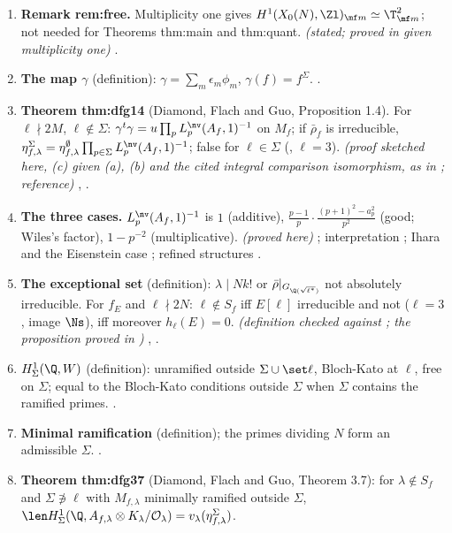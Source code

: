 \begin{enumerate}[label=\textbf{\thechapter.\arabic*}]
\item \textbf{Remark rem:free.} Multiplicity one gives $H^1(X_0(N),\Zl)_{\mf m}\simeq\T_{\mf m}^2$; not needed for Theorems thm:main and thm:quant. \emph{(stated; proved in  given multiplicity one)}
.
\item \textbf{The map $\gamma$} (definition): $\gamma=\sum_m\epsilon_m\phi_m$, $\gamma(f)=f^\Sigma$. .
\item \textbf{Theorem thm:dfg14} (Diamond, Flach and Guo, Proposition 1.4). For $\ell\nmid2M$, $\ell\notin\Sigma$: $\gamma^t\gamma=u\prod_pL^{\nv}_p(A_f,1)^{-1}$ on $M_f$; if $\bar\rho_f$ is irreducible,
$\eta^\Sigma_{f,\lambda}=\eta^\emptyset_{f,\lambda}\prod_{p\in\Sigma}L^{\nv}_p(A_f,1)^{-1}$; false for $\ell\in\Sigma$ (, $\ell=3$). \emph{(proof sketched here, (c) given (a), (b) and the cited integral comparison isomorphism, as in \cite[Proposition 1.4]{DFG04};
reference)} , .
\item \textbf{The three cases.} $L^{\nv}_p(A_f,1)^{-1}$ is $1$ (additive), $\frac{p-1}p\cdot\frac{(p+1)^2-a_p^2}{p^2}$ (good; Wiles's factor), $1-p^{-2}$ (multiplicative). \emph{(proved here)} ;
interpretation ; Ihara and the Eisenstein case ; refined structures .
\item \textbf{The exceptional set} (definition): $\lambda\mid Nk!$ or $\bar\rho|_{G_{\Q(\sqrt{\ell^*})}}$ not absolutely irreducible. For $f_E$ and $\ell\nmid2N$: $\ell\notin S_f$ iff $E[\ell]$ irreducible and not ($\ell=3$, image $\Ns$), iff
moreover $h_\ell(E)=0$. \emph{(definition checked against \cite{DFG04}; the proposition proved in )} , .
\item \textbf{$H^1_\Sigma(\Q,W)$} (definition): unramified outside $\Sigma\cup\set\ell$, Bloch-Kato at $\ell$, free on $\Sigma$; equal to the Bloch-Kato conditions outside $\Sigma$ when $\Sigma$ contains the ramified
primes. .
\item \textbf{Minimal ramification} (definition); the primes dividing $N$ form an admissible $\Sigma$. .
\item \textbf{Theorem thm:dfg37} (Diamond, Flach and Guo, Theorem 3.7): for $\lambda\notin S_f$ and $\Sigma\not\ni\ell$ with $M_{f,\lambda}$ minimally ramified outside $\Sigma$, $\len H^1_\Sigma(\Q,A_{f,\lambda}\otimes K_\lambda/\mathcal O_\lambda)=v_\lambda(\eta^\Sigma_{f,\lambda})$.

\end{enumerate}

